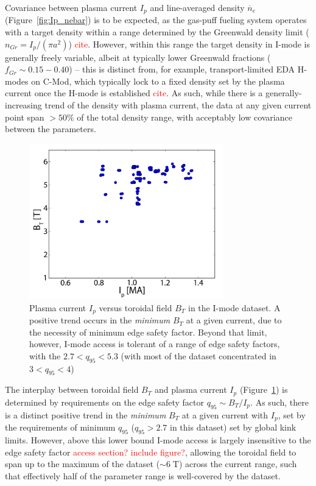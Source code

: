 \documentclass[12pt]{iopart}
\renewcommand{\note}[1]{\textcolor{red}{#1}}
\begin{document}
Covariance between plasma current $I_p$ and line-averaged density $\overline{n}_e$ (Figure~\ref{fig:Ip_nebar}) is to be expected, as the gas-puff fueling system operates with a target density within a range determined by the Greenwald density limit ($n_{Gr} = I_p/(\pi a^2)$) \note{cite}.
However, within this range the target density in I-mode is generally freely variable, albeit at typically lower Greenwald fractions ($f_{Gr} \sim 0.15-0.40$) -- this is distinct from, for example, transport-limited EDA H-modes on C-Mod, which typically lock to a fixed density set by the plasma current once the H-mode is established \note{cite}.
As such, while there is a generally-increasing trend of the density with plasma current, the data at any given current point span $>50\%$ of the total density range, with acceptably low covariance between the parameters.

\begin{figure}[ht]
 \centering
 \includegraphics[width=0.75\textwidth]{Ip_Bt.pdf}
 \caption{Plasma current $I_p$ versus toroidal field $B_T$ in the I-mode dataset.  A positive trend occurs in the \emph{minimum} $B_T$ at a given current, due to the necessity of minimum edge safety factor.  Beyond that limit, however, I-mode access is tolerant of a range of edge safety factors, with the $2.7 < q_{95} < 5.3$ (with most of the dataset concentrated in $3 < q_{95} < 4$)}
 \label{fig:Ip_Bt}
\end{figure}

The interplay between toroidal field $B_T$ and plasma current $I_p$ (Figure~\ref{fig:Ip_Bt}) is determined by requirements on the edge safety factor $q_{95} \sim B_T/I_p$.
As such, there is a distinct positive trend in the \emph{minimum} $B_T$ at a given current with $I_p$, set by the requirements of minimum $q_{95}$ ($q_{95} > 2.7$ in this dataset) set by global kink limits.
However, above this lower bound I-mode access is largely insensitive to the edge safety factor \note{access section?  include figure?}, allowing the toroidal field to span up to the maximum of the dataset ($\sim 6\;\mbox{T}$) across the current range, such that effectively half of the parameter range is well-covered by the dataset.
\end{document}
